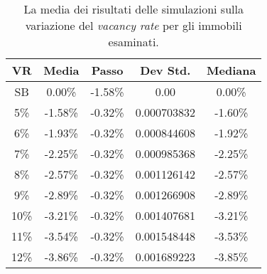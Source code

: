 \begin{table}[htbp]
\begin{center}
\begin{tabular}[c]{|c||*{4}{c|}}
\hline
VR & Media & Passo & Dev Std. & Mediana \\
\hline \hline
SB & 0.00\% & -1.58\% & 0.00 & 0.00\% \\ \hline
5\% & -1.58\% & -0.32\% & 0.000703832 & -1.60\% \\ \hline
6\% & -1.93\% & -0.32\% & 0.000844608 & -1.92\% \\ \hline
7\% & -2.25\% & -0.32\% & 0.000985368 & -2.25\% \\ \hline
8\% & -2.57\% & -0.32\% & 0.001126142 & -2.57\% \\ \hline
9\% & -2.89\% & -0.32\% & 0.001266908 & -2.89\% \\ \hline
10\% & -3.21\% & -0.32\% & 0.001407681 & -3.21\% \\ \hline
11\% & -3.54\% & -0.32\% & 0.001548448 & -3.53\% \\ \hline
12\% & -3.86\% & -0.32\% & 0.001689223 & -3.85\% \\ \hline
\end{tabular}
\caption[Media risultati di un $\Delta^{+}$ {\itshape vacancy rate}]{La media dei risultati delle simulazioni sulla variazione del {\itshape vacancy rate} per gli immobili esaminati.}
\label{tab:varvr}
\end{center}
\end{table}
